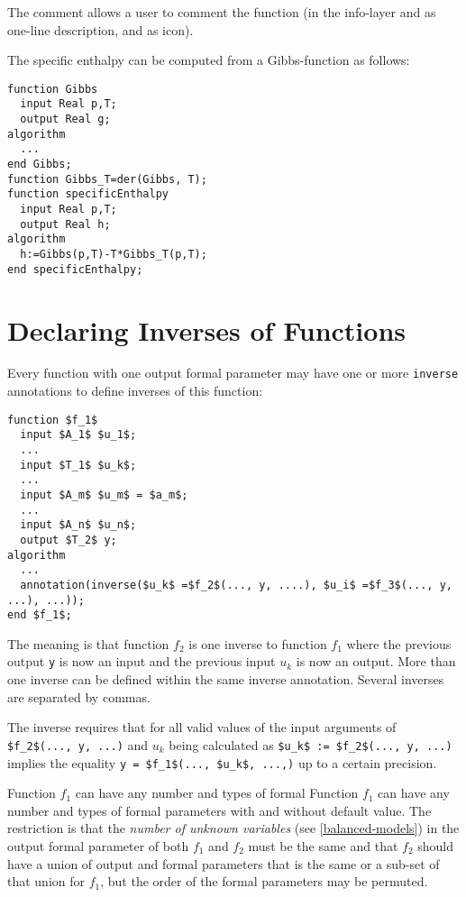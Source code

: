 The comment allows a user to comment the function (in the info-layer and
as one-line description, and as icon).

\begin{example}
The specific enthalpy can be computed from a Gibbs-function as follows:
\begin{lstlisting}[language=modelica]
function Gibbs
  input Real p,T;
  output Real g;
algorithm
  ...
end Gibbs;
function Gibbs_T=der(Gibbs, T);
function specificEnthalpy
  input Real p,T;
  output Real h;
algorithm
  h:=Gibbs(p,T)-T*Gibbs_T(p,T);
end specificEnthalpy;
\end{lstlisting}
\end{example}

\section{Declaring Inverses of Functions}

Every function with one output formal parameter may have one or more
\lstinline!inverse! annotations to define inverses of this function:
\begin{lstlisting}[language=modelica,mathescape=true]
function $f_1$
  input $A_1$ $u_1$;
  ...
  input $T_1$ $u_k$;
  ...
  input $A_m$ $u_m$ = $a_m$;
  ...
  input $A_n$ $u_n$;
  output $T_2$ y;
algorithm
  ...
  annotation(inverse($u_k$ =$f_2$(..., y, ....), $u_i$ =$f_3$(..., y, ...), ...));
end $f_1$;
\end{lstlisting}

The meaning is that function $f_2$ is one inverse to
function $f_1$ where the previous output \lstinline!y! is now an
input and the previous input $u_k$ is now an output. More
than one inverse can be defined within the same inverse annotation.
Several inverses are separated by commas.

\begin{nonnormative}
The inverse requires that for all valid values of the input arguments of \lstinline[mathescape=true]!$f_2$(..., y, ...)! and $u_k$ being calculated as \lstinline[mathescape=true]!$u_k$ := $f_2$(..., y, ...)! implies
the equality \lstinline[mathescape=true]!y = $f_1$(..., $u_k$, ...,)! up to a certain precision.
\end{nonnormative}

Function $f_1$ can have any number and types of formal
Function $f_1$ can have any number and types of formal
parameters with and without default value. The restriction is that the
\emph{number of unknown variables} (see \autoref{balanced-models}) in the output formal
parameter of both $f_1$ and $f_2$ must be
the same and that $f_2$ should have a union of output and formal
parameters that is the same or a sub-set of that union for $f_1$, but the order of the formal
parameters may be permuted.


